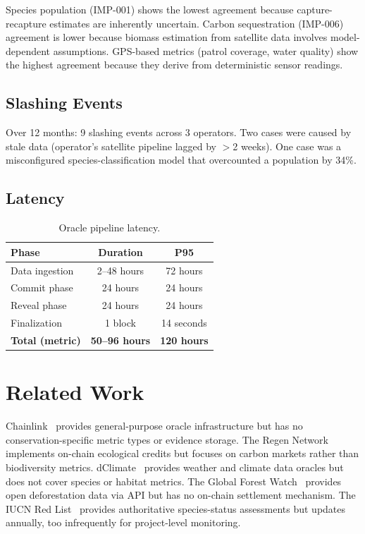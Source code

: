 \documentclass[11pt,letterpaper]{article}
\begin{document}
Species population (IMP-001) shows the lowest agreement because capture-recapture estimates are inherently uncertain. Carbon sequestration (IMP-006) agreement is lower because biomass estimation from satellite data involves model-dependent assumptions. GPS-based metrics (patrol coverage, water quality) show the highest agreement because they derive from deterministic sensor readings.

\subsection{Slashing Events}

Over 12 months: 9 slashing events across 3 operators. Two cases were caused by stale data (operator's satellite pipeline lagged by $>$2 weeks). One case was a misconfigured species-classification model that overcounted a population by 34\%.

\subsection{Latency}

\begin{table}[t]
\centering
\begin{tabular}{lcc}
\toprule
\textbf{Phase} & \textbf{Duration} & \textbf{P95} \\
\midrule
Data ingestion & 2--48 hours & 72 hours \\
Commit phase & 24 hours & 24 hours \\
Reveal phase & 24 hours & 24 hours \\
Finalization & 1 block & 14 seconds \\
\midrule
\textbf{Total (metric)} & \textbf{50--96 hours} & \textbf{120 hours} \\
\bottomrule
\end{tabular}
\caption{Oracle pipeline latency.}
\label{tab:latency}
\end{table}

\section{Related Work}

Chainlink~\cite{chainlink2023} provides general-purpose oracle infrastructure but has no conservation-specific metric types or evidence storage. The Regen Network~\cite{regen2021} implements on-chain ecological credits but focuses on carbon markets rather than biodiversity metrics. dClimate~\cite{dclimate2022} provides weather and climate data oracles but does not cover species or habitat metrics. The Global Forest Watch~\cite{gfw2014} provides open deforestation data via API but has no on-chain settlement mechanism. The IUCN Red List~\cite{iucnredlist2023} provides authoritative species-status assessments but updates annually, too infrequently for project-level monitoring.
\end{document}
